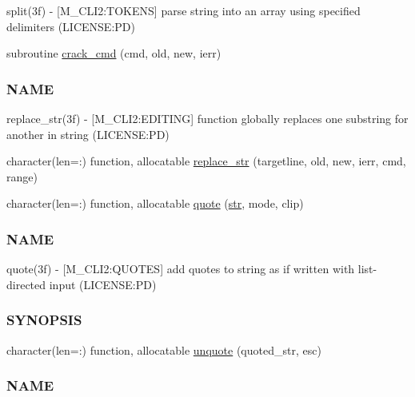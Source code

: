 \begin{DoxyCompactItemize}
\begin{DoxyCompactList}
split(3f) -\/ \mbox{[}M\+\_\+\+C\+L\+I2\+:T\+O\+K\+E\+NS\mbox{]} parse string into an array using specified delimiters (L\+I\+C\+E\+N\+SE\+:PD) \end{DoxyCompactList}\item 
subroutine \mbox{\hyperlink{namespacem__cli2_a710b26995119aee101959555b1bac8e2}{crack\+\_\+cmd}} (cmd, old, new, ierr)
\begin{DoxyCompactList}\small\item\em \subsubsection*{N\+A\+ME}

replace\+\_\+str(3f) -\/ \mbox{[}M\+\_\+\+C\+L\+I2\+:E\+D\+I\+T\+I\+NG\mbox{]} function globally replaces one substring for another in string (L\+I\+C\+E\+N\+SE\+:PD) \end{DoxyCompactList}\item 
character(len=\+:) function, allocatable \mbox{\hyperlink{namespacem__cli2_a8f65cf1b227d837d89437368c660666f}{replace\+\_\+str}} (targetline, old, new, ierr, cmd, range)
\item 
character(len=\+:) function, allocatable \mbox{\hyperlink{namespacem__cli2_a63f81a2c027eb5f3e0a77167ac29fc73}{quote}} (\mbox{\hyperlink{interfacem__cli2_1_1str}{str}}, mode, clip)
\begin{DoxyCompactList}\small\item\em \subsubsection*{N\+A\+ME}

quote(3f) -\/ \mbox{[}M\+\_\+\+C\+L\+I2\+:Q\+U\+O\+T\+ES\mbox{]} add quotes to string as if written with list-\/directed input (L\+I\+C\+E\+N\+SE\+:PD) \subsubsection*{S\+Y\+N\+O\+P\+S\+IS}\end{DoxyCompactList}\item 
character(len=\+:) function, allocatable \mbox{\hyperlink{namespacem__cli2_a9cab7352414f8b5625330a9ff5cf0cb4}{unquote}} (quoted\+\_\+str, esc)
\begin{DoxyCompactList}\small\item\em \subsubsection*{N\+A\+ME}


\end{DoxyCompactList}
\end{DoxyCompactItemize}

